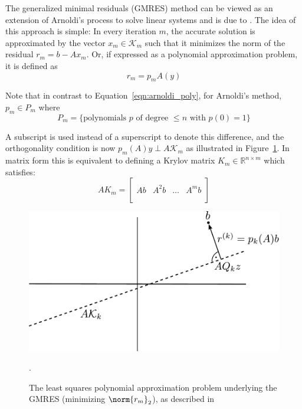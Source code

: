 The generalized minimal residuals (GMRES) method can be viewed as an extension of Arnoldi's process to solve linear systems and is due to \cite{saad_gmres_1986}. The idea of this approach is simple: In every iteration $m$, the accurate solution is approximated by the vector $x_m \in \mathcal{K}_m$ such that it minimizes the norm of the residual $r_m=b-Ax_m$. Or, if expressed as a polynomial approximation problem, it is defined as
\begin{equation}
    r_m=p_mA(y)
\end{equation}

\noindent Note that in contrast to Equation~\hyperref[eqn:arnoldi_poly]{\ref{eqn:arnoldi_poly}}, for Arnoldi's method, $p_m \in P_m$ where
\begin{equation}
    P_m = \{\text{polynomials } p \text{ of degree } \leq n \text{ with }p(0)=1\}
\end{equation}

\noindent A subscript is used instead of a superscript to denote this difference, and the orthogonality condition is now $p_m(A)y \perp A\mathcal{K}_m$ as illustrated in Figure~\hyperref[fig:gmres]{\ref{fig:gmres}}. In matrix form this is equivalent to defining a Krylov matrix $K_m \in \mathbb{R}^{n \times m}$ which satisfies:
\begin{equation}
\label{eqn:krylov_matrix}
  AK_m =
  \left[
    \begin{array}{c|c|c|c}
      & & & \\
      Ab & A^2b & \dots & A^mb \\
      & & & \\
    \end{array}
  \right] 
\end{equation}

\begin{figure}[h]
    \centering
    \includegraphics[width=0.7\linewidth]{figures/GMRES.pdf}
    \caption{The least squares polynomial approximation problem underlying the GMRES (minimizing $\norm{r_m}_2$), as described in \cite{trefethen_numerical_1997}}.
    \label{fig:gmres}
\end{figure}

